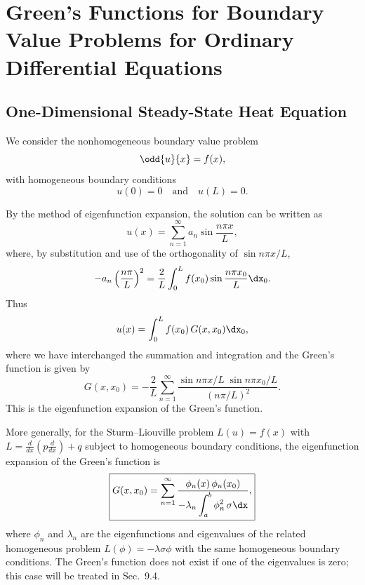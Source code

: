 \section{Green's Functions for Boundary Value Problems for Ordinary Differential Equations}
\label{sec:greens-bvp-ode}

\subsection{One-Dimensional Steady-State Heat Equation}
\label{sec:greens-1d-steady}

We consider the nonhomogeneous boundary value problem
\begin{equation}
\label{eq:9.3.1}
\odd{u}{x} = f(x),
\end{equation}
with homogeneous boundary conditions
\begin{equation}
\label{eq:9.3.2}
u(0) = 0 \quad\text{and}\quad u(L) = 0.
\end{equation}

By the method of eigenfunction expansion, the solution can be written as
\begin{equation}
\label{eq:9.3.3}
u(x) = \sum_{n=1}^{\infty} a_n \sin\frac{n\pi x}{L},
\end{equation}
where, by substitution and use of the orthogonality of $\sin n\pi x/L$,
\[
-a_n\left(\frac{n\pi}{L}\right)^2 = \frac{2}{L}\int_0^L f(x_0)\sin\frac{n\pi x_0}{L}\dx_0.
\]
Thus
\begin{equation}
\label{eq:9.3.4}
u(x) = \int_0^L f(x_0)\,G(x,x_0)\dx_0,
\end{equation}
where we have interchanged the summation and integration and the Green's function is given by
\begin{equation}
\label{eq:9.3.5}
\boxed{G(x,x_0) = -\frac{2}{L}\sum_{n=1}^{\infty} \frac{\sin n\pi x/L\;\sin n\pi x_0/L}{(n\pi/L)^2}.}
\end{equation}
This is the eigenfunction expansion of the Green's function.

More generally, for the Sturm--Liouville problem $L(u) = f(x)$ with $L = \frac{d}{d x}\!\left(p\frac{d}{d x}\right) + q$ subject to homogeneous boundary conditions, the eigenfunction expansion of the Green's function is
\begin{equation}
\label{eq:9.3.6}
\boxed{G(x,x_0) = \sum_{n=1}^{\infty} \frac{\phi_n(x)\,\phi_n(x_0)}{-\lambda_n \displaystyle\int_a^b \phi_n^2\,\sigma\dx},}
\end{equation}
where $\phi_n$ and $\lambda_n$ are the eigenfunctions and eigenvalues of the related homogeneous problem $L(\phi) = -\lambda\sigma\phi$ with the same homogeneous boundary conditions.  The Green's function does not exist if one of the eigenvalues is zero; this case will be treated in Sec.~9.4.

